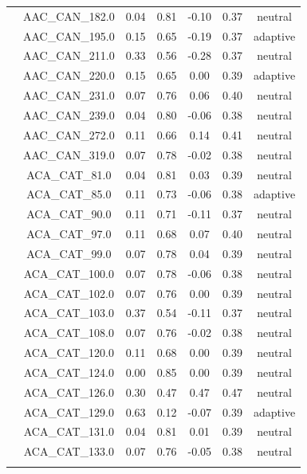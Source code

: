 \documentclass[11pt,]{article}
\begin{document}
\begin{longtable}[c]{@{}lcccccc@{}}
\\\addlinespace
& AAC\_CAN\_182.0 & 0.04 & 0.81 & -0.10 & 0.37 & neutral
\\\addlinespace
& AAC\_CAN\_195.0 & 0.15 & 0.65 & -0.19 & 0.37 & adaptive
\\\addlinespace
& AAC\_CAN\_211.0 & 0.33 & 0.56 & -0.28 & 0.37 & neutral
\\\addlinespace
& AAC\_CAN\_220.0 & 0.15 & 0.65 & 0.00 & 0.39 & adaptive
\\\addlinespace
& AAC\_CAN\_231.0 & 0.07 & 0.76 & 0.06 & 0.40 & neutral
\\\addlinespace
& AAC\_CAN\_239.0 & 0.04 & 0.80 & -0.06 & 0.38 & neutral
\\\addlinespace
& AAC\_CAN\_272.0 & 0.11 & 0.66 & 0.14 & 0.41 & neutral
\\\addlinespace
& AAC\_CAN\_319.0 & 0.07 & 0.78 & -0.02 & 0.38 & neutral
\\\addlinespace
& ACA\_CAT\_81.0 & 0.04 & 0.81 & 0.03 & 0.39 & neutral
\\\addlinespace
& ACA\_CAT\_85.0 & 0.11 & 0.73 & -0.06 & 0.38 & adaptive
\\\addlinespace
& ACA\_CAT\_90.0 & 0.11 & 0.71 & -0.11 & 0.37 & neutral
\\\addlinespace
& ACA\_CAT\_97.0 & 0.11 & 0.68 & 0.07 & 0.40 & neutral
\\\addlinespace
& ACA\_CAT\_99.0 & 0.07 & 0.78 & 0.04 & 0.39 & neutral
\\\addlinespace
& ACA\_CAT\_100.0 & 0.07 & 0.78 & -0.06 & 0.38 & neutral
\\\addlinespace
& ACA\_CAT\_102.0 & 0.07 & 0.76 & 0.00 & 0.39 & neutral
\\\addlinespace
& ACA\_CAT\_103.0 & 0.37 & 0.54 & -0.11 & 0.37 & neutral
\\\addlinespace
& ACA\_CAT\_108.0 & 0.07 & 0.76 & -0.02 & 0.38 & neutral
\\\addlinespace
& ACA\_CAT\_120.0 & 0.11 & 0.68 & 0.00 & 0.39 & neutral
\\\addlinespace
& ACA\_CAT\_124.0 & 0.00 & 0.85 & 0.00 & 0.39 & neutral
\\\addlinespace
& ACA\_CAT\_126.0 & 0.30 & 0.47 & 0.47 & 0.47 & neutral
\\\addlinespace
& ACA\_CAT\_129.0 & 0.63 & 0.12 & -0.07 & 0.39 & adaptive
\\\addlinespace
& ACA\_CAT\_131.0 & 0.04 & 0.81 & 0.01 & 0.39 & neutral
\\\addlinespace
& ACA\_CAT\_133.0 & 0.07 & 0.76 & -0.05 & 0.38 & neutral
\\\addlinespace

\end{longtable}
\end{document}
